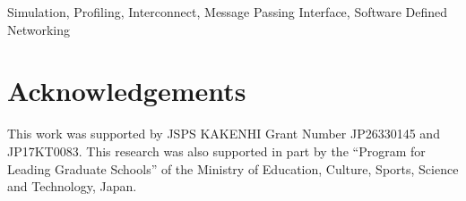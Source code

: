 \documentclass[conference]{IEEEtran}
\begin{document}
\begin{IEEEkeywords}
    Simulation, Profiling, Interconnect, Message Passing Interface, Software
    Defined Networking
\end{IEEEkeywords}








\section*{Acknowledgements}
This work was supported by JSPS KAKENHI Grant Number JP26330145 and
JP17KT0083. This research was also supported in part by the ``Program for
Leading Graduate Schools'' of the Ministry of Education, Culture, Sports,
Science and Technology, Japan.

\printbibliography[heading=bibintoc,title={References}]

\par\leavevmode
\end{document}
